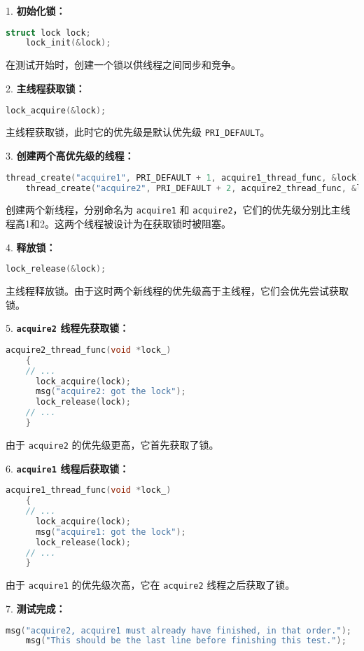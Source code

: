 \documentclass{beamer}
\begin{document}
\begin{frame}
  1. \textbf{初始化锁：}
  \begin{lstlisting}[language=C]
    struct lock lock;
    lock_init(&lock);
\end{lstlisting}

  在测试开始时，创建一个锁以供线程之间同步和竞争。

  2. \textbf{主线程获取锁：}
  \begin{lstlisting}[language=C]
    lock_acquire(&lock);    
\end{lstlisting}

  主线程获取锁，此时它的优先级是默认优先级 \texttt{PRI\_DEFAULT}。

  3. \textbf{创建两个高优先级的线程：}
  \begin{lstlisting}[language=C]
    thread_create("acquire1", PRI_DEFAULT + 1, acquire1_thread_func, &lock);
    thread_create("acquire2", PRI_DEFAULT + 2, acquire2_thread_func, &lock);
\end{lstlisting}

  创建两个新线程，分别命名为 \texttt{acquire1} 和 \texttt{acquire2}，它们的优先级分别比主线程高1和2。这两个线程被设计为在获取锁时被阻塞。

  4. \textbf{释放锁：}
  \begin{lstlisting}[language=C]
    lock_release(&lock);
\end{lstlisting}

  主线程释放锁。由于这时两个新线程的优先级高于主线程，它们会优先尝试获取锁。

  5. \textbf{\texttt{acquire2} 线程先获取锁：}
  \begin{lstlisting}[language=C]
    acquire2_thread_func(void *lock_) 
    {
    // ...
      lock_acquire(lock);
      msg("acquire2: got the lock");
      lock_release(lock);
    // ...
    }
\end{lstlisting}

  由于 \texttt{acquire2} 的优先级更高，它首先获取了锁。

  6. \textbf{\texttt{acquire1} 线程后获取锁：}
  \begin{lstlisting}[language=C]
    acquire1_thread_func(void *lock_) 
    {
    // ...
      lock_acquire(lock);
      msg("acquire1: got the lock");
      lock_release(lock);
    // ...
    }
\end{lstlisting}

  由于 \texttt{acquire1} 的优先级次高，它在 \texttt{acquire2} 线程之后获取了锁。

  7. \textbf{测试完成：}
  \begin{lstlisting}[language=C]
    msg("acquire2, acquire1 must already have finished, in that order.");
    msg("This should be the last line before finishing this test.");
\end{lstlisting}


\end{frame}
\end{document}
